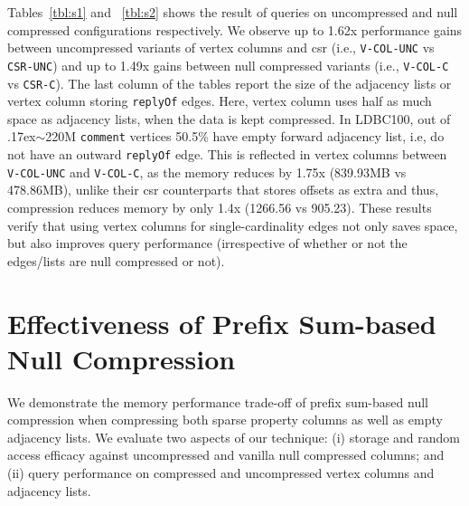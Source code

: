 Tables~\ref{tbl:s1} and ~\ref{tbl:s2} shows the result of queries on uncompressed and null compressed configurations respectively. We observe up to 1.62x performance gains between uncompressed variants of vertex columns and \gls{csr} (i.e., \texttt{V-COL-UNC} vs \texttt{CSR-UNC}) and up to 1.49x gains between null compressed variants (i.e.,  \texttt{V-COL-C} vs \texttt{CSR-C}). The last column of the tables report the size of the adjacency lists or vertex column storing \texttt{replyOf} edges. Here, vertex column uses half as much space as adjacency lists, when the data is kept compressed. In LDBC100, out of {\raise.17ex\hbox{$\scriptstyle\sim$}}220M \texttt{comment} vertices 50.5\% have empty forward adjacency list, i.e, do not have an outward \texttt{replyOf} edge. This is reflected in vertex columns between \texttt{V-COL-UNC} and \texttt{V-COL-C}, as the memory reduces by 1.75x (839.93MB vs 478.86MB), unlike their \gls{csr} counterparts that stores offsets as extra and thus, compression reduces memory by only 1.4x (1266.56 vs 905.23). These results verify that using vertex columns for single-cardinality edges not only saves space, but also improves query performance (irrespective of whether or not the edges/lists are null compressed or not).

\section{Effectiveness of Prefix Sum-based Null Compression}
\label{exp:prefixSum}

We demonstrate the memory performance trade-off of prefix sum-based null compression when compressing both sparse property columns as well as empty adjacency lists. We evaluate two aspects of our technique: (i) storage and random access efficacy against uncompressed and vanilla null compressed columns; and (ii) query performance on compressed and uncompressed vertex columns and adjacency lists.


